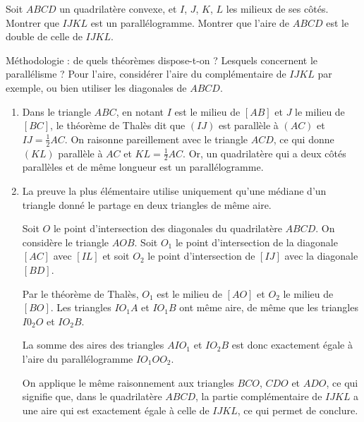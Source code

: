 \begin{exo} \label{Varignon}
Soit $ABCD$ un quadrilatère convexe, et $I$, $J$, $K$, $L$ les milieux de ses côtés. Montrer que $IJKL$ est un parallélogramme. Montrer que l'aire de $ABCD$ est le double de celle de $IJKL$.
\begin{hint} Méthodologie : de quels théorèmes dispose-t-on ? Lesquels concernent le parallélisme ? Pour l'aire, considérer l'aire du complémentaire de $IJKL$ par exemple, ou bien utiliser les diagonales de $ABCD$.
\end{hint}
\begin{sol}
\begin{enumerate}
\item 
Dans le triangle $ABC$, en notant $I$ est le milieu de $[AB]$ et $J$ le milieu de $[BC]$, le théorème de Thalès dit que $(IJ)$ est parall\`ele \`a $(AC)$ et $IJ = \frac{1}{2} AC$. On raisonne pareillement avec le triangle $ACD$, ce qui donne $(KL)$ parall\`ele \`a $AC$ et $KL = \frac{1}{2} AC$. Or, un quadrilat\`ere qui a deux c\^ot\'es parall\`eles et de m\^eme longueur est un parall\'elogramme.

\item La preuve la plus élémentaire utilise uniquement qu'une médiane d'un triangle donné le partage en deux triangles de même aire.

Soit $O$ le point d'intersection des diagonales du quadrilat\`ere $ABCD$. On consid\`ere le triangle $AOB$. Soit $O_1$ le point d'intersection de la diagonale $[AC]$ avec $[IL]$ et soit $O_2$ le point d'intersection de $[IJ]$ avec la diagonale $[BD]$.

 
Par le théorème de Thalès,  $O_1$ est le milieu de $[AO]$ et $O_2$ le milieu de $[BO]$. Les triangles $IO_1A$ et $IO_1B$ ont même aire, de même que les triangles $I0_2O$ et $IO_2B$.

La somme des aires des triangles $AIO_1$ et $IO_2B$ est donc exactement \'egale \`a l'aire du parall\'elogramme $IO_1OO_2$. 
 
On applique le m\^eme raisonnement aux triangles $BCO$, $CDO$ et $ADO$, ce qui signifie que, dans le quadrilat\`ere $ABCD$, la partie compl\'ementaire de $IJKL$ a une aire qui est exactement \'egale \`a celle de $IJKL$, ce qui permet de conclure. \end{enumerate}

\end{sol}
\end{exo}

